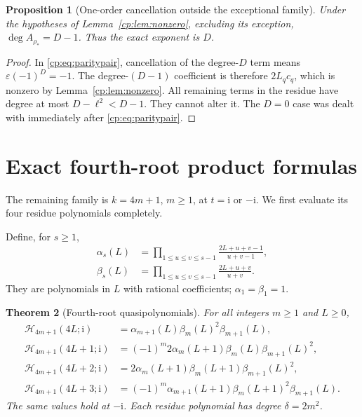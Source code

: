 \documentclass[11pt]{article}
\newtheorem{theorem}{Theorem}[section]
\newtheorem{proposition}[theorem]{Proposition}
\theoremstyle{definition}
\theoremstyle{remark}
\newcommand{\Ht}{\mathcal H}
\newcommand{\ii}{\mathrm i}
\theoremstyle{definition}
\theoremstyle{plain}
\numberwithin{equation}{section}
\begin{document}
\begin{proposition}[One-order cancellation outside the exceptional family]
\label{cp:prop:ordinary}
Under the hypotheses of Lemma~\ref{cp:lem:nonzero}, excluding its exception,
$\deg A_{\rho_*}=D-1$. Thus the exact exponent is $D$.
\end{proposition}
\begin{proof}
In \eqref{cp:eq:paritypair}, cancellation of the degree-$D$ term means
$\varepsilon(-1)^D=-1$. The degree-$(D-1)$ coefficient is therefore
$2L_q c_q$, which is nonzero by Lemma~\ref{cp:lem:nonzero}.
All remaining terms in the residue have degree at most $D-\ell^2<D-1$.
They cannot alter it. The $D=0$ case was dealt with immediately after
\eqref{cp:eq:paritypair}.
\end{proof}

\section{Exact fourth-root product formulas}
\label{cp:sec:quartic}
The remaining family is $k=4m+1$, $m\ge1$, at $t=\ii$ or $-\ii$.
We first evaluate its four residue polynomials completely.

Define, for $s\ge1$,
\begin{align}
 \alpha_s(L)&=\prod_{1\le u\le v\le s-1}
       \frac{2L+u+v-1}{u+v-1},\label{cp:eq:alpha}\\
 \beta_s(L)&=\prod_{1\le u\le v\le s-1}
       \frac{2L+u+v}{u+v}.\label{cp:eq:beta}
\end{align}
They are polynomials in $L$ with rational coefficients; $\alpha_1=\beta_1=1$.

\begin{theorem}[Fourth-root quasipolynomials]
\label{cp:thm:quartic}
For all integers $m\ge1$ and $L\ge0$,
\begin{align}
 \Ht_{4m+1}(4L;\ii)
 &=\alpha_{m+1}(L)\beta_m(L)^2\beta_{m+1}(L),
 \label{cp:eq:quart0}\\
 \Ht_{4m+1}(4L+1;\ii)
 &=(-1)^m2\alpha_m(L+1)\beta_m(L)\beta_{m+1}(L)^2,
 \label{cp:eq:quart1}\\
 \Ht_{4m+1}(4L+2;\ii)
 &=2\alpha_m(L+1)\beta_m(L+1)\beta_{m+1}(L)^2,
 \label{cp:eq:quart2}\\
 \Ht_{4m+1}(4L+3;\ii)
 &=(-1)^m\alpha_{m+1}(L+1)\beta_m(L+1)^2\beta_{m+1}(L).
 \label{cp:eq:quart3}
\end{align}
The same values hold at $-\ii$. Each residue polynomial has degree
$\delta=2m^2$.
\end{theorem}
\end{document}
